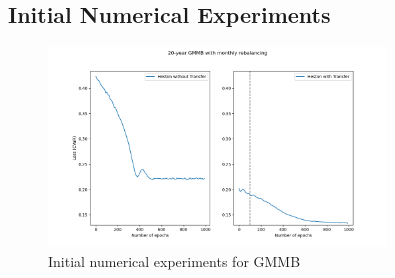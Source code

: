\subsection{Initial Numerical Experiments}

\begin{figure}[ht!]
    \centering
    \includegraphics[width=0.8\textwidth]{./project3/figures/Figure_1.png}
    \caption{Initial numerical experiments for GMMB}
    \label{fig3:GMMB}
\end{figure}


